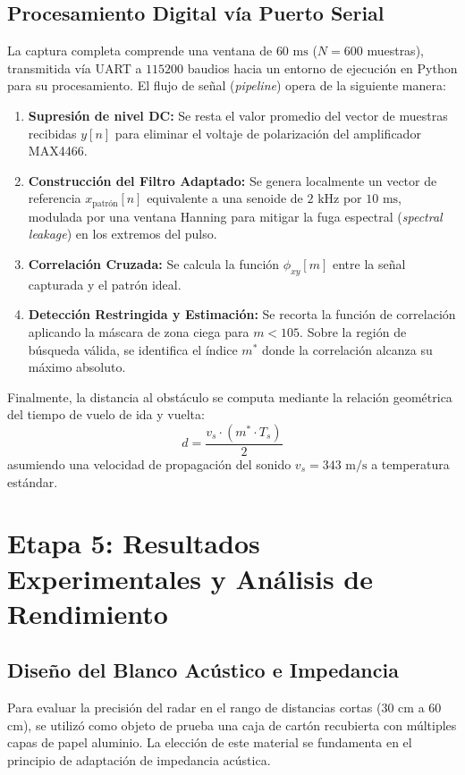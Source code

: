 \documentclass[conference]{IEEEtran}
\begin{document}
\subsection{Procesamiento Digital vía Puerto Serial}
La captura completa comprende una ventana de $60\text{ ms}$ ($N = 600$ muestras), transmitida vía UART a $115200$ baudios hacia un entorno de ejecución en Python para su procesamiento. El flujo de señal (\textit{pipeline}) opera de la siguiente manera:
\begin{enumerate}
    \item \textbf{Supresión de nivel DC:} Se resta el valor promedio del vector de muestras recibidas $y[n]$ para eliminar el voltaje de polarización del amplificador MAX4466.
    \item \textbf{Construcción del Filtro Adaptado:} Se genera localmente un vector de referencia $x_{\text{patrón}}[n]$ equivalente a una senoide de $2\text{ kHz}$ por $10\text{ ms}$, modulada por una ventana Hanning para mitigar la fuga espectral (\textit{spectral leakage}) en los extremos del pulso.
    \item \textbf{Correlación Cruzada:} Se calcula la función $\phi_{xy}[m]$ entre la señal capturada y el patrón ideal.
    \item \textbf{Detección Restringida y Estimación:} Se recorta la función de correlación aplicando la máscara de zona ciega para $m < 105$. Sobre la región de búsqueda válida, se identifica el índice $m^*$ donde la correlación alcanza su máximo absoluto.
\end{enumerate}
Finalmente, la distancia al obstáculo se computa mediante la relación geométrica del tiempo de vuelo de ida y vuelta:
\begin{equation}
d = \frac{v_s \cdot (m^* \cdot T_s)}{2}
\end{equation}
asumiendo una velocidad de propagación del sonido $v_s = 343\text{ m/s}$ a temperatura estándar.

\section{Etapa 5: Resultados Experimentales y Análisis de Rendimiento}

\subsection{Diseño del Blanco Acústico e Impedancia}
Para evaluar la precisión del radar en el rango de distancias cortas (30 cm a 60 cm), se utilizó como objeto de prueba una caja de cartón recubierta con múltiples capas de papel aluminio. La elección de este material se fundamenta en el principio de adaptación de impedancia acústica. 
\end{document}
